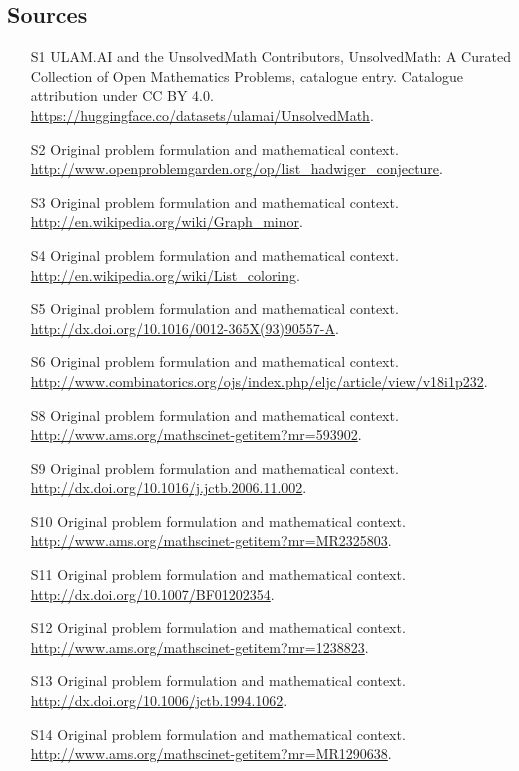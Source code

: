 \documentclass[11pt]{article}
\begin{document}
\subsection{Sources}
\begin{itemize}
\item[\hypertarget{source:statement:1}{S1}] ULAM.AI and the UnsolvedMath Contributors, UnsolvedMath: A Curated Collection of Open Mathematics Problems, catalogue entry. Catalogue attribution under CC BY 4.0.
\url{https://huggingface.co/datasets/ulamai/UnsolvedMath}.
\item[\hypertarget{source:statement:2}{S2}] Original problem formulation and mathematical context.
\url{http://www.openproblemgarden.org/op/list_hadwiger_conjecture}.
\item[\hypertarget{source:statement:3}{S3}] Original problem formulation and mathematical context.
\url{http://en.wikipedia.org/wiki/Graph_minor}.
\item[\hypertarget{source:statement:4}{S4}] Original problem formulation and mathematical context.
\url{http://en.wikipedia.org/wiki/List_coloring}.
\item[\hypertarget{source:statement:5}{S5}] Original problem formulation and mathematical context.
\url{http://dx.doi.org/10.1016/0012-365X(93)90557-A}.
\item[\hypertarget{source:statement:6}{S6}] Original problem formulation and mathematical context.
\url{http://www.combinatorics.org/ojs/index.php/eljc/article/view/v18i1p232}.
\item[\hypertarget{source:statement:8}{S8}] Original problem formulation and mathematical context.
\url{http://www.ams.org/mathscinet-getitem?mr=593902}.
\item[\hypertarget{source:statement:9}{S9}] Original problem formulation and mathematical context.
\url{http://dx.doi.org/10.1016/j.jctb.2006.11.002}.
\item[\hypertarget{source:statement:10}{S10}] Original problem formulation and mathematical context.
\url{http://www.ams.org/mathscinet-getitem?mr=MR2325803}.
\item[\hypertarget{source:statement:11}{S11}] Original problem formulation and mathematical context.
\url{http://dx.doi.org/10.1007/BF01202354}.
\item[\hypertarget{source:statement:12}{S12}] Original problem formulation and mathematical context.
\url{http://www.ams.org/mathscinet-getitem?mr=1238823}.
\item[\hypertarget{source:statement:13}{S13}] Original problem formulation and mathematical context.
\url{http://dx.doi.org/10.1006/jctb.1994.1062}.
\item[\hypertarget{source:statement:14}{S14}] Original problem formulation and mathematical context.
\url{http://www.ams.org/mathscinet-getitem?mr=MR1290638}.
\end{itemize}
\label{end:statement}
\end{document}
